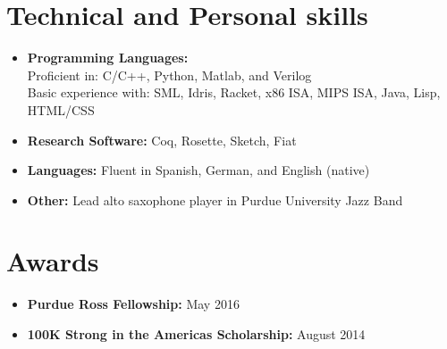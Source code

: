 \documentclass[10pt,a4paper,sans]{moderncv}        %
\begin{document}
\section{Technical and Personal skills}

\vspace{4pt}

\begin{itemize}

\item \textbf{Programming Languages:} \\
  Proficient in: C/C++, Python, Matlab, and Verilog \\ Basic experience with: SML, Idris, Racket,
  x86 ISA, MIPS ISA, Java, Lisp, HTML/CSS

\vspace{4pt}

\item \textbf{Research Software:} Coq, Rosette, Sketch, Fiat

\vspace{4pt}

\item \textbf{Languages:} Fluent in Spanish, German, and English (native)

\vspace{4pt}

\item \textbf{Other:} Lead alto saxophone player in Purdue University
  Jazz Band

\end{itemize}

\section{Awards}

\vspace{4pt}

\begin{itemize}


\item \textbf{Purdue Ross Fellowship:} May 2016
\vspace{4pt}
\item \textbf{100K Strong in the Americas Scholarship:} August 2014

\end{itemize}


\nocite{*}

\end{document}
